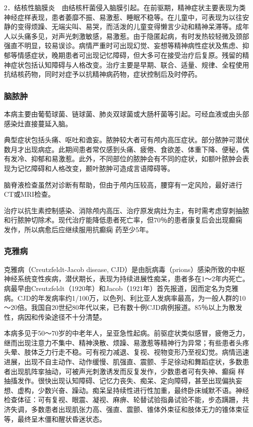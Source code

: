 2．结核性脑膜炎　由结核杆菌侵入脑膜引起。在前驱期，精神症状主要表现为类神经症样表现，患者萎靡不振、易激惹、睡眠不稳等。在儿童中，可表现为以往安静的变得烦躁、无端尖叫、易哭，而活泼的儿童变得懒言少动和精神呆滞等。成年人以头痛多见，对声光刺激敏感，易激惹。由于隐匿起病，有时发热较轻微及颈部强直不明显，较易误诊。病情严重时可出现幻觉、妄想等精神病性症状及焦虑、抑郁等情感症状，晚期患者可出现记忆障碍，但大多可在接受治疗后复原。残留的精神症状包括认知障碍与人格改变。治疗主要是早期、联合、适量、规律、全程使用抗结核药物，同时对症予以抗精神病药物，症状控制后及时停药。

\subsubsection{脑脓肿}

本病主要由葡萄球菌、链球菌、肺炎双球菌或大肠杆菌等引起。可经血液或由头部感染灶直接蔓延入脑。

典型症状包括头痛、呕吐和谵妄。脓肿较大者可有颅内高压症状。部分脓肿可潜伏数月才出现病症。此期间患者常仅感到头痛、疲倦、食欲差、体重下降、便秘，偶有发冷、抑郁和易激惹。此外，不同部位的脓肿会有不同的症状，如额叶脓肿会表现为记忆障碍和人格改变，颞叶脓肿可造成言语障碍等。

脑脊液检查虽然对诊断有帮助，但由于颅内压较高，腰穿有一定风险，最好进行CT或MRI检查。

治疗以抗生素控制感染、消除颅内高压、治疗原发病灶为主，有时需考虑穿刺抽脓和行脓肿切除术。现代治疗能降低患者死亡率，但70％的患者康复后会出现癫痫
发作，所以病愈后应继续服用抗癫痫
药至少5年。

\subsubsection{克雅病}

克雅病（Creutzfeldt-Jacob disease,
CJD）是由朊病毒（prions）感染所致的中枢神经系统变性疾病，潜伏期长，表现为持续进展性痴呆，患者多在1～2年内死亡。病最早由Creutzfeldt（1920年）和Jacob（1921年）首先报道，因而定名为克雅病。CJD的年发病率约1/100万，以色列、利比亚人发病率最高，为一般人群的10～20倍。我国自20世纪80年代以来，已有数十例CJD病例报道。85％以上为散发性，病因和传染途径不十分清楚。

本病多见于50～70岁的中老年人，呈亚急性起病。前驱症状类似感冒，疲倦乏力，继而出现注意力不集中、精神涣散、烦躁、易激惹等精神行为异常；有些患者头疼头晕、肢体乏力行走不稳。可有视力减退、复视、视物变形乃至视幻觉。病情迅速进展，出现不自主动作、动作缓慢、肌强直、震颤、手足徐动和舞蹈症状，多数患者出现肌阵挛抽动，可被声光刺激诱发而反复发作，少数患者可有失神、癫痫
样抽搐发作。很快出现认知障碍、记忆力丧失、痴呆、定向障碍，甚至出现偏执妄想、虚构，少数兴奋、躁动。痴呆呈持续性进行性加重，最终卧床缄默不语。神经检查体征：可有复视、眼震、凝视、麻痹、轮替试验指鼻试验不能，步态蹒跚，共济失调，多数患者出现肌张力高、强直、震颤、锥体外束征和肢体无力的锥体束征等，最终呈木僵和醒状昏迷状态。

